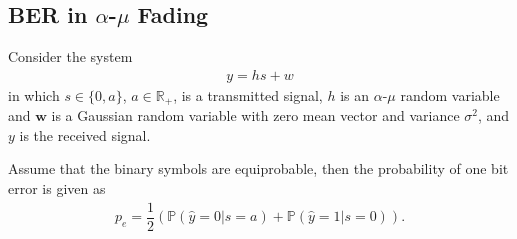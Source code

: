 \documentclass[conference, 10pt]{IEEEtran}
\begin{document}
%
%
%


\subsection{BER in $\alpha$-$\mu$ Fading}

Consider the system
\begin{align}
    y = hs + w
\end{align}
in which $s \in \{0, a\}$, $a \in \mathbb{R}_{+}$, is a transmitted signal,
$h$ is an $\alpha$-$\mu$ random variable and $\bm{w}$ is a Gaussian random variable
with zero mean vector and variance $\sigma^2$, and $y$ is the received signal.

Assume that the binary symbols are equiprobable, then the probability of one bit error
is given as
\begin{align}
    p_{e} = \dfrac{1}{2}\left(\mathbb{P}\left(\hat{y} = 0 | s = a\right)
                            + \mathbb{P}\left(\hat{y} = 1 | s = 0\right)\right).
\end{align}
\end{document}

